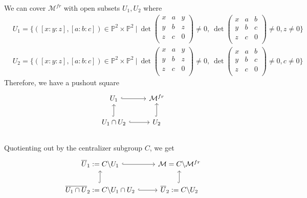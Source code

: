 \begin{example}
We can cover $\mathcal{M}^{fr}$ with open subsets $U_1,U_2$ where 
\begin{align*}
	&U_{1}=\{
	([x:y:z],[a:b:c])\in \mathbb{P}^2 \times \mathbb{P}^2~|~
	\operatorname{det}
	\begin{pmatrix}
	x&a&y\\
	y&b&z\\
	z&c&0\\
	\end{pmatrix}
	\neq 0,~
	\operatorname{det}
	\begin{pmatrix}
	x&a&b\\
	y&b&c\\
	z&c&0\\
	\end{pmatrix}
	\neq 0,
	z\neq 0	 	
	\}\\
	&U_{2}=
	\{
	([x:y:z],[a:b:c])\in \mathbb{P}^2 \times \mathbb{P}^2~|~
	\operatorname{det}
	\begin{pmatrix}
	x&a&y\\
	y&b&z\\
	z&c&0\\
	\end{pmatrix}
	\neq 0,~
	\operatorname{det}
	\begin{pmatrix}
	x&a&b\\
	y&b&c\\
	z&c&0\\
	\end{pmatrix}
	\neq 0,
	c\neq 0	 	
	\}	
\end{align*}
Therefore, we have a pushout square
\begin{displaymath}
\begin{tikzcd}
  U_1\arrow[hookrightarrow]{r} & \mathcal{M}^{fr} \\
  U_1 \cap U_2 \arrow[hookrightarrow]{u} \arrow[r,hookrightarrow] & U_2 \arrow[hookrightarrow]{u} 
\end{tikzcd} 
\end{displaymath}\\
Quotienting out by the centralizer subgroup $C$, we get
\begin{displaymath}
\begin{tikzcd}
  \overline{U}_1:=C\backslash U_1\arrow[r,hookrightarrow] & \mathcal{M}=C\backslash\mathcal{M}^{fr} \\
  \overline{U_1 \cap U}_2:=C\backslash U_1 \cap U_2 \arrow[hookrightarrow]{u} \arrow[r,hookrightarrow] & \overline{U}_2:=C\backslash U_2 \arrow[hookrightarrow]{u} 
\end{tikzcd} 
\end{displaymath}

\end{example}
